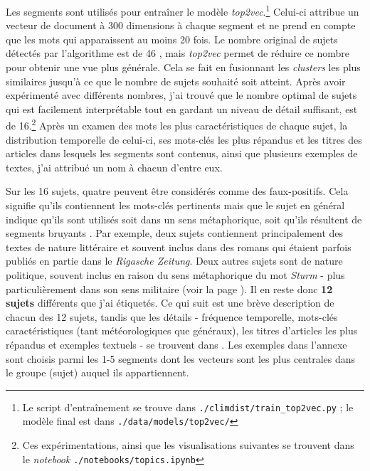 \documentclass[a4paper,twoside,12pt]{article}
\begin{document}
Les segments sont utilisés pour entraîner le modèle \textit{top2vec}.\footnote{Le script d'entraînement se trouve dans \texttt{./climdist/train\_top2vec.py} ; le modèle final est dans \texttt{./data/models/top2vec/}} Celui-ci attribue un vecteur de document à 300 dimensions à chaque segment et ne prend en compte que les mots qui apparaissent au moins 20 fois. Le nombre original de sujets détectés par l'algorithme est de 46 \label{46_topics}, mais \textit{top2vec} permet de réduire ce nombre pour obtenir une vue plus générale. Cela se fait en fusionnant les \textit{clusters} les plus similaires jusqu'à ce que le nombre de sujets souhaité soit atteint. Après avoir expérimenté avec différents nombres, j'ai trouvé que le nombre optimal de sujets qui est facilement interprétable tout en gardant un niveau de détail suffisant, est de 16.\footnote{Ces expérimentations, ainsi que les visualisations suivantes se trouvent dans le \textit{notebook} \newline \texttt{./notebooks/topics.ipynb}} Après un examen des mots les plus caractéristiques de chaque sujet, la distribution temporelle de celui-ci, ses mots-clés les plus répandus et les titres des articles dans lesquels les segments sont contenus, ainsi que plusieurs exemples de textes, j'ai attribué un nom à chacun d'entre eux.

Sur les 16 sujets, quatre peuvent être considérés comme des faux-positifs. Cela signifie qu'ils contiennent les mots-clés pertinents mais que le sujet en général indique qu'ils sont utilisés soit dans un sens métaphorique, soit qu'ils résultent de segments \og bruyants \fg{}. Par exemple, deux sujets contiennent principalement des textes de nature littéraire et souvent inclus dans des romans qui étaient parfois publiés en partie dans le \textit{Rigasche Zeitung}. Deux autres sujets sont de nature politique, souvent inclus en raison du sens métaphorique du mot \textit{Sturm} - plus particulièrement dans son sens militaire (voir la page \pageref{fig:sturm_wordclouds}). Il en reste donc \textbf{12 sujets} différents que j'ai étiquetés. Ce qui suit est une brève description de chacun des 12 sujets, tandis que les détails - fréquence temporelle, mots-clés caractéristiques (tant météorologiques que généraux), les titres d'articles les plus répandus et exemples textuels - se trouvent dans . Les exemples dans l'annexe sont choisis parmi les 1-5 segments dont les vecteurs sont les plus centrales dans le groupe (sujet) auquel ils appartiennent.
\end{document}
